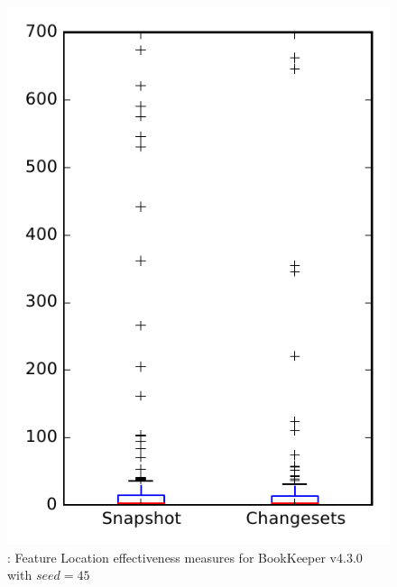 
\begin{figure}
\centering
\includegraphics[height=0.4\textheight]{figures/flt_seed/rq1_bookkeeper_45}
\caption{\rone: Feature Location effectiveness measures for BookKeeper v4.3.0 with $seed=45$}
\label{fig:flt_seed:rq1:bookkeeper}
\end{figure}
